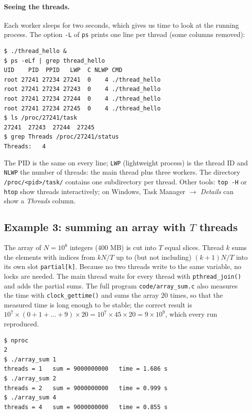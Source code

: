 \documentclass[11pt,a4paper]{article}
\newcommand{\cmd}[1]{\texttt{#1}}
\begin{document}
\paragraph{Seeing the threads.} Each worker sleeps for two seconds, which gives us time to look at the running process. The option \cmd{-L} of \cmd{ps} prints one line per thread (some columns removed):

\begin{lstlisting}[style=term]
$ ./thread_hello &
$ ps -eLf | grep thread_hello
UID    PID  PPID   LWP  C NLWP CMD
root 27241 27234 27241  0    4 ./thread_hello
root 27241 27234 27243  0    4 ./thread_hello
root 27241 27234 27244  0    4 ./thread_hello
root 27241 27234 27245  0    4 ./thread_hello
$ ls /proc/27241/task
27241  27243  27244  27245
$ grep Threads /proc/27241/status
Threads:   4
\end{lstlisting}

The PID is the same on every line; \texttt{LWP} (lightweight process) is the thread ID and \texttt{NLWP} the number of threads: the main thread plus three workers. The directory \cmd{/proc/<pid>/task/} contains one subdirectory per thread. Other tools: \cmd{top -H} or \cmd{htop} show threads interactively; on Windows, Task Manager $\to$ \emph{Details} can show a \emph{Threads} column.

\subsection{Example 3: summing an array with $T$ threads}
\label{sec:arraysum}



The array of $N = 10^{8}$ integers ($400$ MB) is cut into $T$ equal slices. Thread $k$ sums the elements with indices from $kN/T$ up to (but not including) $(k+1)N/T$ into its own slot \cmd{partial[k]}. Because no two threads write to the same variable, no locks are needed. The main thread waits for every thread with \cmd{pthread\_join()} and adds the partial sums. The full program \texttt{code/array\_sum.c} also measures the time with \cmd{clock\_gettime()} and sums the array $20$ times, so that the measured time is long enough to be stable; the correct result is $10^{7} \times (0+1+\dots+9) \times 20 = 10^{7}\times 45\times 20 = 9\times10^{9}$, which every run reproduced.

\begin{lstlisting}[style=term]
$ nproc
2
$ ./array_sum 1
threads = 1   sum = 9000000000   time = 1.686 s
$ ./array_sum 2
threads = 2   sum = 9000000000   time = 0.999 s
$ ./array_sum 4
threads = 4   sum = 9000000000   time = 0.855 s
\end{lstlisting}
\end{document}
